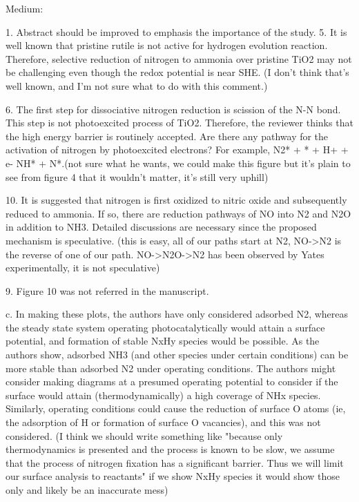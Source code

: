 Medium:

1. Abstract should be improved to emphasis the importance of the study.
5. It is well known that pristine rutile is not active for hydrogen evolution reaction. Therefore, selective reduction of nitrogen to ammonia over pristine TiO2 may not be challenging even though the redox potential is near SHE. (I don't think that's well known, and I'm not sure what to do with this comment.)

6. The first step for dissociative nitrogen reduction is scission of the N-N bond. This step is not photoexcited process of TiO2. Therefore, the reviewer thinks that the high energy barrier is routinely accepted. Are there any pathway for the activation of nitrogen by photoexcited electrons? For example, N2* + * + H+ + e-  NH* + N*.(not sure what he wants, we could make this figure but it's plain to see from figure 4 that it wouldn't matter, it's still very uphill)

10. It is suggested that nitrogen is first oxidized to nitric oxide and subsequently reduced to ammonia. If so, there are reduction pathways of NO into N2 and N2O in addition to NH3. Detailed discussions are necessary since the proposed mechanism is speculative. (this is easy, all of our paths start at N2, NO->N2 is the reverse of one of our path. NO->N2O->N2 has been observed by Yates experimentally, it is not speculative)

9. Figure 10 was not referred in the manuscript.

c.      In making these plots, the authors have only considered adsorbed N2, whereas the steady state system operating photocatalytically would attain a surface potential, and formation of stable NxHy species would be possible.  As the authors show, adsorbed NH3 (and other species under certain conditions) can be more stable than adsorbed N2 under operating conditions.  The authors might consider making diagrams at a presumed operating potential to consider if the surface would attain (thermodynamically) a high coverage of NHx species.  Similarly, operating conditions could cause the reduction of surface O atoms (ie, the adsorption of H or formation of surface O vacancies), and this was not considered. (I think we should write something like "because only thermodynamics is presented and the process is known to be slow, we assume that the process of nitrogen fixation has a significant barrier. Thus we will limit our surface analysis to reactants" if we show NxHy species it would show those only and likely be an inaccurate mess)


